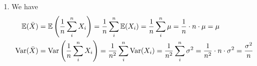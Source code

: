 \documentclass{harvardml}
\theoremstyle{definition}
\theoremstyle{plain}
\newcommand{\E}{\mathbb{E}}
\newcommand{\var}{\text{Var}}
\newcommand{\cov}{\text{Cov}}
\begin{document}
\begin{problem}
\begin{enumerate} [label=(\alph*)]
\begin{align*}
	&= \E[X^2 + 2XY + Y^2] - (\E[X]+\E[Y])^2 \\
	&= \E[X^2]-(\E[X])^2 + \E[Y^2]-(\E[Y])^2 + 2(\E[XY]-\E[X]\E[Y]) \\
	&= \var(X) + \var(Y) + 2\cov(X, Y)
\end{align*}
\item We have
\begin{align*}
    \E(\Bar{X}) &= \E\left(\frac{1}{n}\sum_i^n X_i\right) = \frac{1}{n}\sum_i^n \E(X_i) = \frac{1}{n}\sum_i^n \mu = \frac{1}{n} \cdot n \cdot \mu = \mu \\ 
    \var(\Bar{X}) &= \var\left(\frac{1}{n}\sum_i^n X_i\right) = \frac{1}{n^2}\sum_i^n \var(X_i) = \frac{1}{n^2}\sum_i^n \sigma^2 = \frac{1}{n^2} \cdot n \cdot \sigma^2 = \frac{\sigma^2}{n}
\end{align*}
\end{enumerate}
\end{problem}
\end{document}
